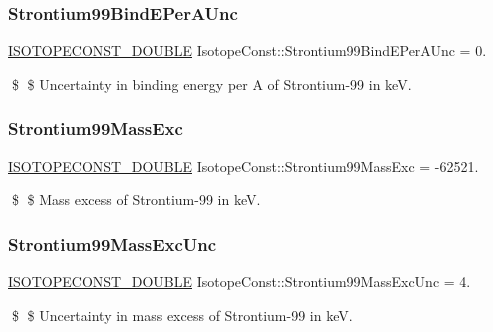 \subsubsection{\texorpdfstring{Strontium99\+Bind\+E\+Per\+A\+Unc}{Strontium99BindEPerAUnc}}
{\footnotesize\ttfamily \mbox{\hyperlink{group___isotope_const-_macros_ga8f45a7272ce02c0b4c65c44636ed719a}{I\+S\+O\+T\+O\+P\+E\+C\+O\+N\+S\+T\+\_\+\+D\+O\+U\+B\+LE}} Isotope\+Const\+::\+Strontium99\+Bind\+E\+Per\+A\+Unc = 0.}

\$ \$ Uncertainty in binding energy per A of Strontium-\/99 in keV. \mbox{\label{group___isotope_const-_strontium-_sr99_ga060a2647b590bc34ffbee38730633c64}} 
\subsubsection{\texorpdfstring{Strontium99\+Mass\+Exc}{Strontium99MassExc}}
{\footnotesize\ttfamily \mbox{\hyperlink{group___isotope_const-_macros_ga8f45a7272ce02c0b4c65c44636ed719a}{I\+S\+O\+T\+O\+P\+E\+C\+O\+N\+S\+T\+\_\+\+D\+O\+U\+B\+LE}} Isotope\+Const\+::\+Strontium99\+Mass\+Exc = -\/62521.}

\$ \$ Mass excess of Strontium-\/99 in keV. \mbox{\label{group___isotope_const-_strontium-_sr99_gabe0f3286ce8a1790af337f899c183f85}} 
\subsubsection{\texorpdfstring{Strontium99\+Mass\+Exc\+Unc}{Strontium99MassExcUnc}}
{\footnotesize\ttfamily \mbox{\hyperlink{group___isotope_const-_macros_ga8f45a7272ce02c0b4c65c44636ed719a}{I\+S\+O\+T\+O\+P\+E\+C\+O\+N\+S\+T\+\_\+\+D\+O\+U\+B\+LE}} Isotope\+Const\+::\+Strontium99\+Mass\+Exc\+Unc = 4.}

\$ \$ Uncertainty in mass excess of Strontium-\/99 in keV. \mbox{\label{group___isotope_const-_strontium-_sr99_gae9f023173ccd068431945dca77998e90}} 
